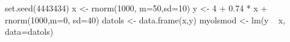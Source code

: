 \begin{Schunk}
\begin{Sinput}
 set.seed(4443434)
 x <- rnorm(1000, m=50,sd=10)
 y <- 4 + 0.74 * x + rnorm(1000,m=0, sd=40)
 datols <- data.frame(x,y)
 myolsmod <- lm(y ~ x, data=datols)
\end{Sinput}
\end{Schunk}
